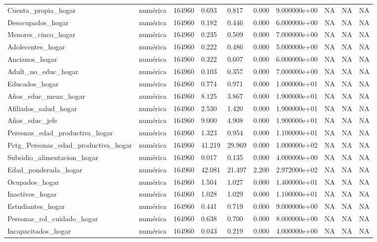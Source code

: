 \begin{longtable}[t]{llllllllll}
Cuenta\_propia\_hogar & numérica & 164960 & 0.693 & 0.817 & 0.000 & 9.000000e+00 & NA & NA & NA\\
Desocupados\_hogar & numérica & 164960 & 0.182 & 0.446 & 0.000 & 6.000000e+00 & NA & NA & NA\\
Menores\_cinco\_hogar & numérica & 164960 & 0.235 & 0.509 & 0.000 & 7.000000e+00 & NA & NA & NA\\
Adolecentes\_hogar & numérica & 164960 & 0.222 & 0.486 & 0.000 & 5.000000e+00 & NA & NA & NA\\
Ancianos\_hogar & numérica & 164960 & 0.322 & 0.607 & 0.000 & 6.000000e+00 & NA & NA & NA\\
Adult\_no\_educ\_hogar & numérica & 164960 & 0.103 & 0.357 & 0.000 & 7.000000e+00 & NA & NA & NA\\
Educados\_hogar & numérica & 164960 & 0.774 & 0.971 & 0.000 & 1.000000e+01 & NA & NA & NA\\
Años\_educ\_mean\_hogar & numérica & 164960 & 8.125 & 3.867 & 0.000 & 1.900000e+01 & NA & NA & NA\\
Afiliados\_salud\_hogar & numérica & 164960 & 2.530 & 1.420 & 0.000 & 1.900000e+01 & NA & NA & NA\\
Años\_educ\_jefe & numérica & 164960 & 9.000 & 4.908 & 0.000 & 1.900000e+01 & NA & NA & NA\\
Personas\_edad\_productiva\_hogar & numérica & 164960 & 1.323 & 0.954 & 0.000 & 1.100000e+01 & NA & NA & NA\\
Pctg\_Personas\_edad\_productiva\_hogar & numérica & 164960 & 41.219 & 29.969 & 0.000 & 1.000000e+02 & NA & NA & NA\\
Subsidio\_alimentacion\_hogar & numérica & 164960 & 0.017 & 0.135 & 0.000 & 4.000000e+00 & NA & NA & NA\\
Edad\_ponderada\_hogar & numérica & 164960 & 42.081 & 21.497 & 2.200 & 2.972000e+02 & NA & NA & NA\\
Ocupados\_hogar & numérica & 164960 & 1.504 & 1.027 & 0.000 & 1.400000e+01 & NA & NA & NA\\
Inactivos\_hogar & numérica & 164960 & 1.028 & 1.029 & 0.000 & 1.100000e+01 & NA & NA & NA\\
Estudiantes\_hogar & numérica & 164960 & 0.441 & 0.719 & 0.000 & 9.000000e+00 & NA & NA & NA\\
Personas\_rol\_cuidado\_hogar & numérica & 164960 & 0.638 & 0.700 & 0.000 & 8.000000e+00 & NA & NA & NA\\
Incapacitados\_hogar & numérica & 164960 & 0.043 & 0.219 & 0.000 & 4.000000e+00 & NA & NA & NA\\

\end{longtable}
